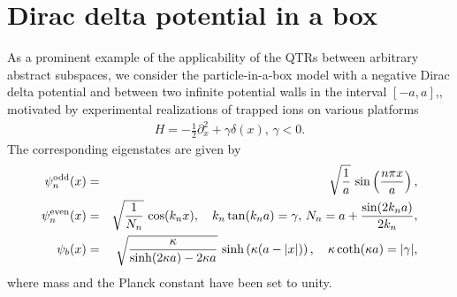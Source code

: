 \documentclass[prl,aps,amssymb,twocolumn,superscriptaddress, notitlepage, longbibliography]{revtex4-2}
\begin{document}
\section{Dirac delta potential in a box}
As a prominent example of the applicability of the QTRs between arbitrary abstract subspaces, we consider the particle-in-a-box model with a negative Dirac delta potential and between two infinite potential walls in the interval $[-a,a]$,, motivated by experimental realizations of trapped ions on various platforms~\cite{Gaunt_TrapBEC_2013,Navon2021_OpticalTrap}
\begin{eqnarray}\label{eq: H_Dirac}
    H=-\frac{1}{2}\partial^2_x+\gamma\delta(x),\,\gamma<0.
\end{eqnarray}
The corresponding eigenstates are given by
\begin{eqnarray}\label{eq: Dirac_box}
\psi_n^{\rm odd}(x) &=& \sqrt{\frac{1}{a}} \, \sin\left(\frac{n \pi x}{a}\right),\\
\psi_n^{\rm even}(x) &=& \sqrt{\frac{1}{N_n}} \, \cos(k_n x),\quad k_n \tan(k_n a) = \gamma,\,N_n=a+\frac{\sin(2k_na)}{2k_n}, \\
\psi_b(x) &=& \sqrt{\frac{\kappa}{\sinh(2 \kappa a) - 2 \kappa a}} \, \sinh\left(\kappa (a - |x|)\right),\quad  \kappa \coth(\kappa a) = |\gamma|,
\end{eqnarray}
where mass and the Planck constant have been set to unity.
\end{document}
